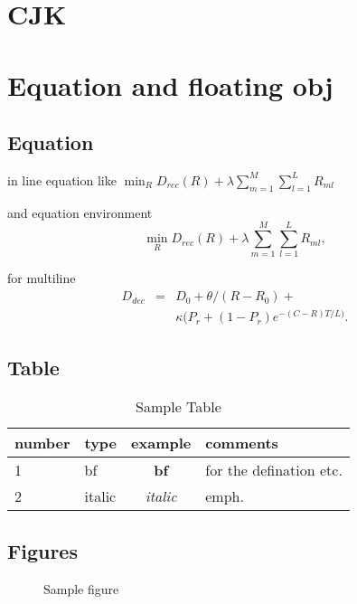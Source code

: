 \documentclass[a4paper,12pt]{article}
\begin{document}
\section{CJK}

\begin{CJK*}{GB}{song}


	{

	}
\end{CJK*}
\section{Equation and floating obj}
\subsection{Equation}

in line equation like
$\min_R D_{rec}(R)+\lambda\sum_{m=1}^{M}%
\sum_{l=1}^{L}R_{ml}$

and equation environment
\begin{equation}
\min_R D_{rec}(R)+\lambda\sum_{m=1}^{M}%
\sum_{l=1}^{L}R_{ml},
\end{equation}

for multiline
\begin{eqnarray}
D_{dec}&=&D_0+\theta/(R-R_0)+ \nonumber\\
       & &\kappa(P_r+(1-P_r)e^{-(C-R)T/L)}.
\label{equ:distort}
\end{eqnarray}

\subsection{Table}

\begin{table}[htb]
\centering
\caption{Sample Table}
\label{tab:sample}
\begin{tabular}{|l|lc|p{5em}|}
\hline
number & type & example & comments \\
\hline
\hline
\hline
1	& bf	&\textbf{bf}	& for the
defination etc.\\
2	& italic&\textit{italic}& emph.\\
\hline
\end{tabular}
\end{table}

\subsection{Figures}

\begin{figure}[htb]
	\begin{center}
	\end{center}
	\caption{Sample figure}
	\label{fig:sample}
\end{figure}
\end{document}
